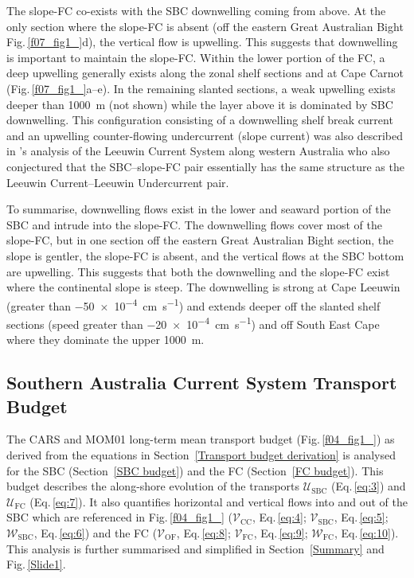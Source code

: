 \documentclass[preprint,3p,review,12pt]{elsarticle}
\newcommand{\citepos}[1]{\citeauthor{#1}'s \citeyearpar{#1}}
\newcommand{\sub}[1]{_{\text{#1}}}
\begin{document}
The slope-FC co-exists with the SBC downwelling coming from above. At the only section where the slope-FC is absent (off the eastern Great Australian Bight Fig.\,\ref{f07_fig1_}d), the vertical flow is upwelling. This suggests that downwelling is important to maintain the slope-FC\@.
Within the lower portion of the FC, a deep upwelling generally exists along the zonal shelf sections and at Cape Carnot (Fig.\,\ref{f07_fig1_}a--e).
In the remaining slanted sections, a weak upwelling exists deeper than \SI{1000}{\meter} (not shown) while the layer above it is dominated by SBC downwelling. This configuration consisting of a downwelling shelf break current and an upwelling counter-flowing undercurrent (slope current) was also described in \citepos{Woo2008} analysis of the Leeuwin Current System along western Australia who also conjectured that the SBC--slope-FC pair essentially has the same structure as the Leeuwin Current--Leeuwin Undercurrent pair.

To summarise, downwelling flows exist in the lower and seaward portion of the SBC and intrude into the slope-FC\@. The downwelling flows cover most of the slope-FC, but in one section off the eastern Great Australian Bight section, the slope is gentler, the slope-FC is absent, and the vertical flows at the SBC bottom are upwelling. This suggests that both the downwelling and the slope-FC exist where the continental slope is steep. The downwelling is strong at Cape Leeuwin (greater than \SI{-50 e-4}{\centi\meter\per\second}) and extends deeper off the slanted shelf sections (speed greater than \SI{-20 e-4}{\centi\meter\per\second}) and off South East Cape where they dominate the upper \SI{1000}{\meter}. 

\subsection{Southern Australia Current System Transport Budget} \label{Southern Australia Current System Transport Budget}
The CARS and MOM01 long-term mean transport budget (Fig.\,\ref{f04_fig1_}) as derived from the equations in Section~\ref{Transport budget derivation} is analysed for the SBC (Section~\ref{SBC budget}) and the FC (Section~\ref{FC budget}). This budget describes the along-shore evolution of the transports  $\mathcal{U}\sub{SBC}$ (Eq.\,\ref{eq:3}) and  $\mathcal{U}\sub{FC}$ (Eq.\,\ref{eq:7}).
It also quantifies
horizontal and vertical flows into and out of
the SBC which are referenced in Fig.\,\ref{f04_fig1_} ($\mathcal{V}\sub{CC}$, Eq.\,\ref{eq:4}; $\mathcal{V}\sub{SBC}$, Eq.\,\ref{eq:5}; $\mathcal{W}\sub{SBC}$, Eq.\,\ref{eq:6}) and
the FC ($\mathcal{V}\sub{OF}$, Eq.\,\ref{eq:8}; $\mathcal{V}\sub{FC}$, Eq.\,\ref{eq:9}; $\mathcal{W}\sub{FC}$, Eq.\,\ref{eq:10}). This analysis is further summarised and simplified in Section~\ref{Summary} and Fig.\,\ref{Slide1}.
\end{document}
